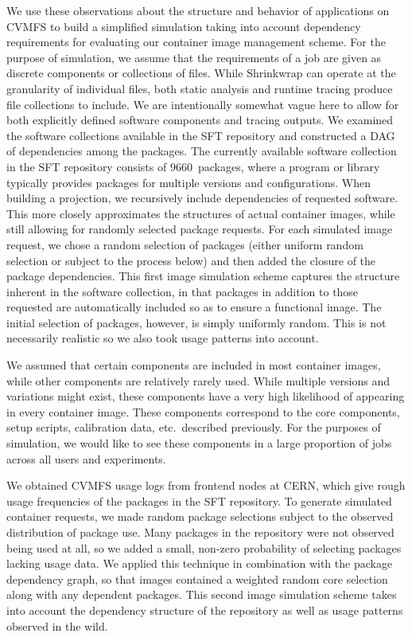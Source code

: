 \documentclass[sigconf]{acmart}
\begin{document}
 We use these observations about the structure and behavior of applications on CVMFS to build a simplified simulation taking into account dependency requirements for evaluating our container image management scheme.
For the purpose of simulation,
we assume that the requirements of a job are given as discrete components or collections of files.
While Shrinkwrap can operate at the granularity of individual files,
both static analysis and runtime tracing produce file collections to include.
We are intentionally somewhat vague here to allow for both explicitly defined software components and tracing outputs.
We examined the software collections available in the SFT repository and constructed a DAG of dependencies among the packages.
The currently available software collection in the SFT repository consists of 9660~packages,
where a program or library typically provides packages for multiple versions and configurations.
When building a projection,
we recursively include dependencies of requested software.
This more closely approximates the structures of actual container images,
while still allowing for randomly selected package requests.
For each simulated image request,
we chose a random selection of packages (either uniform random selection or subject to the process below)
and then added the closure of the package dependencies.
This first image simulation scheme captures the structure inherent in the software collection,
in that packages in addition to those requested are automatically included so as to ensure a functional image.
The initial selection of packages,
however, is simply uniformly random.
This is not necessarily realistic
so we also took usage patterns into account.

We assumed that certain components are included in most container images,
while other components are relatively rarely used.
While multiple versions and variations might exist,
these components have a very high likelihood of appearing in every container image.
These components correspond to the core components, setup scripts, calibration data, etc.\ described previously.
For the purposes of simulation,
we would like to see these components in a large proportion of jobs across all users and experiments.

We obtained CVMFS usage logs from frontend nodes at CERN,
which give rough usage frequencies of the packages in the SFT repository.
To generate simulated container requests,
we made random package selections subject to the observed distribution of package use.
Many packages in the repository were not observed being used at all,
so we added a small, non-zero probability of selecting packages lacking usage data.
We applied this technique in combination with the package dependency graph,
so that images contained a weighted random core selection along with any dependent packages.
This second image simulation scheme takes into account the dependency structure of the repository as well as usage patterns observed in the wild.
\end{document}
